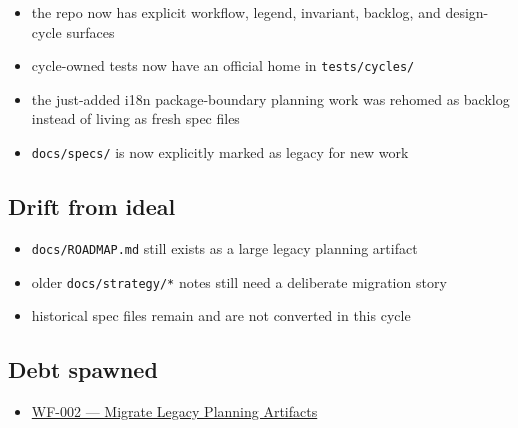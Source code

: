 \begin{itemize}
\tightlist
\item
  the repo now has explicit workflow, legend, invariant, backlog, and design-cycle surfaces
\item
  cycle-owned tests now have an official home in \texttt{t\allowbreak{}e\allowbreak{}s\allowbreak{}t\allowbreak{}s\allowbreak{}/\allowbreak{}c\allowbreak{}y\allowbreak{}c\allowbreak{}l\allowbreak{}e\allowbreak{}s\allowbreak{}/}
\item
  the just-added i18n package-boundary planning work was rehomed as backlog instead of living as fresh spec files
\item
  \texttt{d\allowbreak{}o\allowbreak{}c\allowbreak{}s\allowbreak{}/\allowbreak{}s\allowbreak{}p\allowbreak{}e\allowbreak{}c\allowbreak{}s\allowbreak{}/} is now explicitly marked as legacy for new work
\end{itemize}

\subsection{Drift from ideal}\label{record-200-drift-from-ideal}

\begin{itemize}
\tightlist
\item
  \texttt{d\allowbreak{}o\allowbreak{}c\allowbreak{}s\allowbreak{}/\allowbreak{}R\allowbreak{}O\allowbreak{}A\allowbreak{}D\allowbreak{}M\allowbreak{}A\allowbreak{}P\allowbreak{}.\allowbreak{}m\allowbreak{}d} still exists as a large legacy planning artifact
\item
  older \texttt{d\allowbreak{}o\allowbreak{}c\allowbreak{}s\allowbreak{}/\allowbreak{}s\allowbreak{}t\allowbreak{}r\allowbreak{}a\allowbreak{}t\allowbreak{}e\allowbreak{}g\allowbreak{}y\allowbreak{}/\allowbreak{}*} notes still need a deliberate migration story
\item
  historical spec files remain and are not converted in this cycle
\end{itemize}

\subsection{Debt spawned}\label{record-200-debt-spawned}

\begin{itemize}
\tightlist
\item
  \href{https://github.com/flyingrobots/bijou/blob/cbd70612140e7a450d764b3c7be1c6af878b99bc/docs/method/retro/WF_002-migrate-legacy-planning-artifacts.md}{WF-002 --- Migrate Legacy Planning Artifacts}
\end{itemize}

